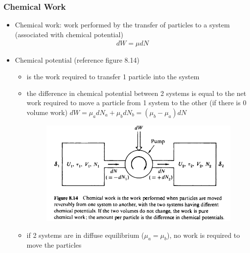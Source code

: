 \subsubsection{Chemical Work}
\begin{itemize}
    \item Chemical work: work performed by the transfer of particles to a system (associated with
    chemical potential)
    \begin{align}
        dW = \mu dN
    \end{align}
    \item Chemical potential (reference figure 8.14)
    \begin{itemize}
        \item is the work required to transfer 1 particle into the system
        \item the difference in chemical potential between 2 systems is equal to the net work
        required to move a particle from 1 system to the other (if there is 0 volume work)
        $dW = \mu_a dN_a + \mu_b dN_b = (\mu_b - \mu_a)dN$
        \begin{figure}[h]
            \centering
            \includegraphics[width=.75\textwidth]{Figures/chemical_work.png}
            \label{fig:chemical_work}
        \end{figure}
        \item if 2 systems are in diffuse equilibrium ($\mu_a = \mu_b$), no work is required to move
        the particles
    \end{itemize}
\end{itemize}


